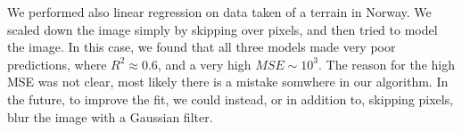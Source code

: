 \documentclass[a4paper,10pt,english]{article}
\begin{document}
We performed also linear regression on data taken of a terrain in Norway. We scaled down the image simply by skipping over pixels, and then tried to model the image. In this case, we found that all three models made very poor predictions, where $R^2\approx0.6$, and a very high $MSE\sim 10^3$. The reason for the high MSE was not clear, most likely there is a mistake somwhere in our algorithm. In the future, to improve the fit, we could instead, or in addition to, skipping pixels, blur the image with a Gaussian filter.


\end{document}
